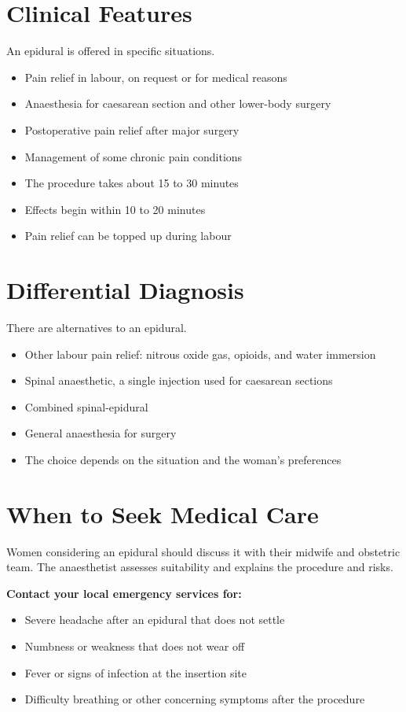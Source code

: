 \section*{Clinical Features}
An epidural is offered in specific situations.
\begin{itemize}
    \item Pain relief in labour, on request or for medical reasons
    \item Anaesthesia for caesarean section and other lower-body surgery
    \item Postoperative pain relief after major surgery
    \item Management of some chronic pain conditions
    \item The procedure takes about 15 to 30 minutes
    \item Effects begin within 10 to 20 minutes
    \item Pain relief can be topped up during labour
\end{itemize}

\section*{Differential Diagnosis}
There are alternatives to an epidural.
\begin{itemize}
    \item Other labour pain relief: nitrous oxide gas, opioids, and water immersion
    \item Spinal anaesthetic, a single injection used for caesarean sections
    \item Combined spinal-epidural
    \item General anaesthesia for surgery
    \item The choice depends on the situation and the woman's preferences
\end{itemize}

\section*{When to Seek Medical Care}
Women considering an epidural should discuss it with their midwife and obstetric team. The anaesthetist assesses suitability and explains the procedure and risks.

\textbf{Contact your local emergency services for:}
\begin{itemize}
    \item Severe headache after an epidural that does not settle
    \item Numbness or weakness that does not wear off
    \item Fever or signs of infection at the insertion site
    \item Difficulty breathing or other concerning symptoms after the procedure
\end{itemize}

